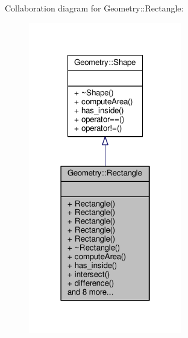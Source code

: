 Collaboration diagram for Geometry\+:\+:Rectangle\+:\nopagebreak
\begin{figure}[H]
\begin{center}
\leavevmode
\includegraphics[width=190pt]{classGeometry_1_1Rectangle__coll__graph}
\end{center}
\end{figure}
